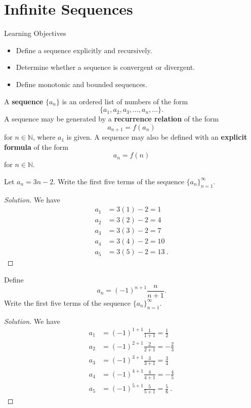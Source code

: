 \documentclass[compacto,10pt,comentarios]{aleph-notas}
\begin{document}
\encabezado

\section*{Infinite Sequences}
\begin{mdframed}
    \center Learning Objectives \\
    \begin{itemize}
        \item Define a sequence explicitly and recursively.
        \item Determine whether a sequence is convergent or divergent.
        \item Define monotonic and bounded sequences.
    \end{itemize}
\end{mdframed}

\begin{defi}[Sequences]
    A \textbf{sequence} $\{ a_{n} \}$ is an ordered list of numbers of the form
    $$
        \{ a_1, a_2, a_3, \ldots, a_n, \ldots \}.
    $$
    A sequence may be generated by a \textbf{recurrence relation} 
    of the form 
    $$
        a_{n+1} = f(a_n)
    $$
    for $n \in \mathbb{N}$, where $a_1$ is given.
    A sequence may also be defined with an \textbf{explicit formula} of the form 
    $$
        a_n = f(n)
    $$
    for $n \in \mathbb{N}$.
\end{defi}

\begin{ejer}
    Let $a_n = 3n-2$. Write the first five terms of the sequence $\{a_n\}_{n=1}^{\infty}$.
\end{ejer}
\begin{proof}[Solution]
    We have
    \begin{align*}
        a_1 & = 3(1) - 2 = 1 \\
        a_2 & = 3(2) - 2 = 4 \\ 
        a_3 & = 3(3) - 2 = 7 \\
        a_4 & = 3(4) - 2 = 10 \\
        a_5 & = 3(5) - 2 = 13 ~ .
    \end{align*}    
\end{proof}

\begin{ejer}
    Define
    $$
        a_n = (-1)^{n+1} \frac{n}{n+1}.
    $$
    Write the first five terms of the sequence $\{a_n\}_{n=1}^{\infty}$.
\end{ejer}
\begin{proof}[Solution]
    We have
    \begin{align*}
        a_1 & = (-1)^{1+1} \frac{1}{1+1} = \frac{1}{2} \\
        a_2 & = (-1)^{2+1} \frac{2}{2+1} = -\frac{2}{3} \\ 
        a_3 & = (-1)^{3+1} \frac{3}{3+1} = \frac{3}{4} \\
        a_4 & = (-1)^{4+1} \frac{4}{4+1} = -\frac{4}{5} \\ 
        a_5 & = (-1)^{5+1} \frac{5}{5+1} = \frac{5}{6} ~ .
    \end{align*}    
\end{proof}
\end{document}
